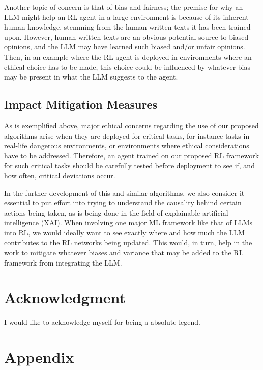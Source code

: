 \documentclass[conference]{IEEEtran}
\begin{document}
Another topic of concern is that of bias and fairness; the premise for why an LLM might help an RL agent in a large environment is because of its inherent human knowledge, stemming from the human-written texts it has been trained upon. However, human-written texts are an obvious potential source to biased opinions, and the LLM may have learned such biased and/or unfair opinions. Then, in an example where the RL agent is deployed in environments where an ethical choice has to be made, this choice could be influenced by whatever bias may be present in what the LLM suggests to the agent.

\subsection{Impact Mitigation Measures}

As is exemplified above, major ethical concerns regarding the use of our proposed algorithms arise when they are deployed for critical tasks, for instance tasks in real-life dangerous environments, or environments where ethical considerations have to be addressed. Therefore, an agent trained on our proposed RL framework for such critical tasks should be carefully tested before deployment to see if, and how often, critical deviations occur.

In the further development of this and similar algorithms, we also consider it essential to put effort into trying to understand the causality behind certain actions being taken, as is being done in the field of explainable artificial intelligence (XAI). When involving one major ML framework like that of LLMs into RL, we would ideally want to see exactly where and how much the LLM contributes to the RL networks being updated. This would, in turn, help in the work to mitigate whatever biases and variance that may be added to the RL framework from integrating the LLM.

\section*{Acknowledgment}

I would like to acknowledge myself for being a absolute legend.





\section*{Appendix}
\end{document}
